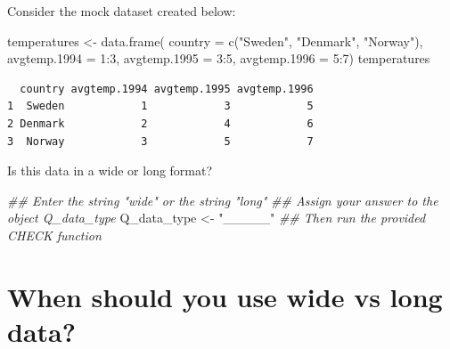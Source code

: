\documentclass[
  letterpaper,
  DIV=11,
  numbers=noendperiod]{scrreprt}
\newenvironment{Shaded}{\begin{snugshade}}{\end{snugshade}}
\newcommand{\AttributeTok}[1]{\textcolor[rgb]{0.40,0.45,0.13}{#1}}
\newcommand{\DecValTok}[1]{\textcolor[rgb]{0.68,0.00,0.00}{#1}}
\newcommand{\DocumentationTok}[1]{\textcolor[rgb]{0.37,0.37,0.37}{\textit{#1}}}
\newcommand{\FunctionTok}[1]{\textcolor[rgb]{0.28,0.35,0.67}{#1}}
\newcommand{\NormalTok}[1]{\textcolor[rgb]{0.00,0.23,0.31}{#1}}
\newcommand{\OtherTok}[1]{\textcolor[rgb]{0.00,0.23,0.31}{#1}}
\newcommand{\SpecialCharTok}[1]{\textcolor[rgb]{0.37,0.37,0.37}{#1}}
\newcommand{\StringTok}[1]{\textcolor[rgb]{0.13,0.47,0.30}{#1}}
\begin{document}
\begin{tcolorbox}[enhanced jigsaw, colframe=quarto-callout-tip-color-frame, rightrule=.15mm, opacityback=0, breakable, coltitle=black, colbacktitle=quarto-callout-tip-color!10!white, bottomrule=.15mm, leftrule=.75mm, toprule=.15mm, arc=.35mm, bottomtitle=1mm, colback=white, left=2mm, opacitybacktitle=0.6, titlerule=0mm, title=\textcolor{quarto-callout-tip-color}{\faLightbulb}\hspace{0.5em}{Practice}, toptitle=1mm]

Consider the mock dataset created below:

\begin{Shaded}
\begin{Highlighting}[]
\NormalTok{temperatures }\OtherTok{\textless{}{-}} 
  \FunctionTok{data.frame}\NormalTok{(}
    \AttributeTok{country =} \FunctionTok{c}\NormalTok{(}\StringTok{"Sweden"}\NormalTok{, }\StringTok{"Denmark"}\NormalTok{, }\StringTok{"Norway"}\NormalTok{),}
    \AttributeTok{avgtemp.1994 =} \DecValTok{1}\SpecialCharTok{:}\DecValTok{3}\NormalTok{,}
    \AttributeTok{avgtemp.1995 =} \DecValTok{3}\SpecialCharTok{:}\DecValTok{5}\NormalTok{,}
    \AttributeTok{avgtemp.1996 =} \DecValTok{5}\SpecialCharTok{:}\DecValTok{7}\NormalTok{)}
\NormalTok{temperatures}
\end{Highlighting}
\end{Shaded}

\begin{verbatim}
  country avgtemp.1994 avgtemp.1995 avgtemp.1996
1  Sweden            1            3            5
2 Denmark            2            4            6
3  Norway            3            5            7
\end{verbatim}

Is this data in a wide or long format?

\begin{Shaded}
\begin{Highlighting}[]
\DocumentationTok{\#\# Enter the string "wide" or the string "long"}
\DocumentationTok{\#\# Assign your answer to the object Q\_data\_type}
\NormalTok{Q\_data\_type }\OtherTok{\textless{}{-}} \StringTok{"\_\_\_\_\_"}
\DocumentationTok{\#\# Then run the provided CHECK function}
\end{Highlighting}
\end{Shaded}

\end{tcolorbox}

\hypertarget{when-should-you-use-wide-vs-long-data}{%
\section{When should you use wide vs long
data?}\label{when-should-you-use-wide-vs-long-data}}
\end{document}
